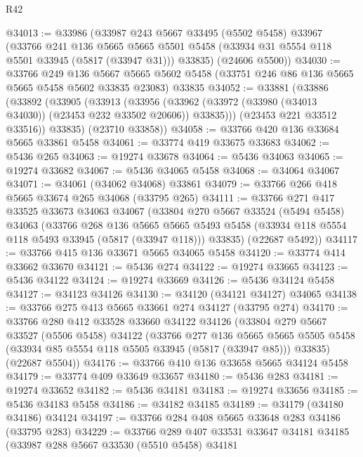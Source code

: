 \begin{lexlean}{R42}
\begin{coremodule}
@34013 := @33986
    (@33987
      @243
      @5667
      @33495
      (@5502 @5458)
      @33967
      (@33766
        @241
        @136
        @5665
        @5665
        @5501
        @5458
        (@33934 @31 @5554 @118 @5501 @33945 (@5817 (@33947 @31)))
        @33835)
      (@24606 @5500))
@34030 := @33766
    @249
    @136
    @5667
    @5665
    @5602
    @5458
    (@33751 @246 @86 @136 @5665 @5665 @5458 @5602 @33835 @23083)
    @33835
@34052 := @33881
    (@33886
      (@33892
        (@33905
          (@33913
            (@33956 (@33962 (@33972 (@33980 (@34013 @34030)) (@23453 @232 @33502 @20606)) @33835)))
          (@23453 @221 @33512 @33516))
        @33835)
      (@23710 @33858))
@34058 := @33766 @420 @136 @33684 @5665 @33861 @5458
@34061 := @33774 @419 @33675 @33683
@34062 := @5436 @265
@34063 := @19274 @33678
@34064 := @5436 @34063
@34065 := @19274 @33682
@34067 := @5436 @34065 @5458
@34068 := @34064 @34067
@34071 := @34061 (@34062 @34068) @33861
@34079 := @33766 @266 @418 @5665 @33674 @265 @34068 (@33795 @265)
@34111 := @33766
    @271
    @417
    @33525
    @33673
    @34063
    @34067
    (@33804
      @270
      @5667
      @33524
      (@5494 @5458)
      @34063
      (@33766
        @268
        @136
        @5665
        @5665
        @5493
        @5458
        (@33934 @118 @5554 @118 @5493 @33945 (@5817 (@33947 @118)))
        @33835)
      (@22687 @5492))
@34117 := @33766 @415 @136 @33671 @5665 @34065 @5458
@34120 := @33774 @414 @33662 @33670
@34121 := @5436 @274
@34122 := @19274 @33665
@34123 := @5436 @34122
@34124 := @19274 @33669
@34126 := @5436 @34124 @5458
@34127 := @34123 @34126
@34130 := @34120 (@34121 @34127) @34065
@34138 := @33766 @275 @413 @5665 @33661 @274 @34127 (@33795 @274)
@34170 := @33766
    @280
    @412
    @33528
    @33660
    @34122
    @34126
    (@33804
      @279
      @5667
      @33527
      (@5506 @5458)
      @34122
      (@33766
        @277
        @136
        @5665
        @5665
        @5505
        @5458
        (@33934 @85 @5554 @118 @5505 @33945 (@5817 (@33947 @85)))
        @33835)
      (@22687 @5504))
@34176 := @33766 @410 @136 @33658 @5665 @34124 @5458
@34179 := @33774 @409 @33649 @33657
@34180 := @5436 @283
@34181 := @19274 @33652
@34182 := @5436 @34181
@34183 := @19274 @33656
@34185 := @5436 @34183 @5458
@34186 := @34182 @34185
@34189 := @34179 (@34180 @34186) @34124
@34197 := @33766 @284 @408 @5665 @33648 @283 @34186 (@33795 @283)
@34229 := @33766
    @289
    @407
    @33531
    @33647
    @34181
    @34185
    (@33987
      @288
      @5667
      @33530
      (@5510 @5458)
      @34181

\end{coremodule}
\end{lexlean}
